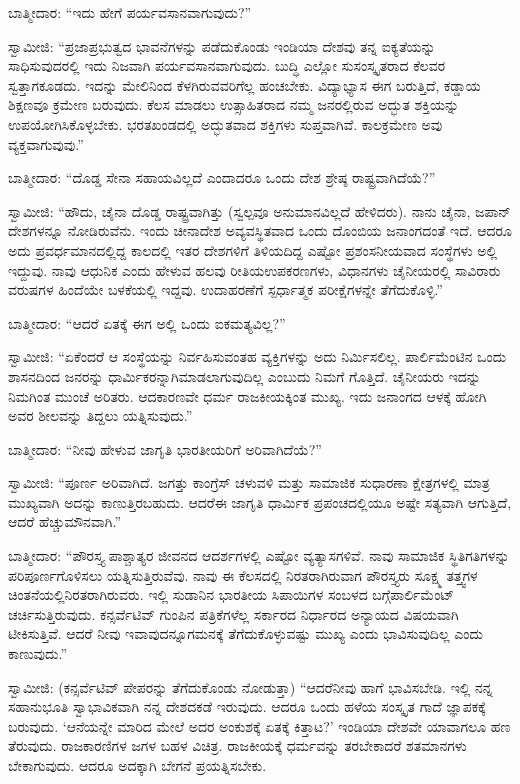 ಬಾತ್ಮೀದಾರ: “ಇದು ಹೇಗೆ ಪರ್ಯವಸಾನವಾಗುವುದು?”

ಸ್ವಾಮೀಜಿ: “ಪ್ರಜಾಪ್ರಭುತ್ವದ ಭಾವನೆಗಳನ್ನು ಪಡೆದುಕೊಂಡು ಇಂಡಿಯಾ ದೇಶವು ತನ್ನ ಐಕ್ಯತೆಯನ್ನು ಸಾಧಿಸುವುದರಲ್ಲಿ ಇದು ನಿಜವಾಗಿ ಪರ್ಯವಸಾನವಾಗುವುದು. ಬುದ್ಧಿ ಎಲ್ಲೋ ಸುಸಂಸ್ಕೃತರಾದ ಕೆಲವರ ಸ್ವತ್ತಾಗಕೂಡದು. ಇದನ್ನು ಮೇಲಿನಿಂದ ಕೆಳಗಿರುವವರಿ\-ಗೆಲ್ಲ ಹಂಚಬೇಕು. ವಿದ್ಯಾಭ್ಯಾಸ ಈಗ ಬರುತ್ತಿದೆ, ಕಡ್ಡಾಯ ಶಿಕ್ಷಣವೂ ಕ್ರಮೇಣ ಬರುವುದು. ಕೆಲಸ ಮಾಡಲು ಉತ್ಸಾಹಿತರಾದ ನಮ್ಮ ಜನರಲ್ಲಿರುವ ಅದ್ಭುತ ಶಕ್ತಿಯನ್ನು ಉಪಯೋಗಿಸಿಕೊಳ್ಳಬೇಕು. ಭರತಖಂಡದಲ್ಲಿ ಅದ್ಭುತವಾದ ಶಕ್ತಿಗಳು ಸುಪ್ತವಾಗಿವೆ. ಕಾಲಕ್ರಮೇಣ ಅವು ವ್ಯಕ್ತವಾಗುವುವು.”

ಬಾತ್ಮೀದಾರ: “ದೊಡ್ಡ ಸೇನಾ ಸಹಾಯವಿಲ್ಲದೆ ಎಂದಾದರೂ ಒಂದು ದೇಶ ಶ್ರೇಷ್ಠ ರಾಷ್ಟ್ರವಾಗಿದೆಯೆ?”

ಸ್ವಾಮೀಜಿ: “ಹೌದು, ಚೈನಾ ದೊಡ್ಡ ರಾಷ್ಟ್ರವಾಗಿತ್ತು (ಸ್ವಲ್ಪವೂ ಅನುಮಾನವಿಲ್ಲದೆ ಹೇಳಿದರು). ನಾನು ಚೈನಾ, ಜಪಾನ್​ ದೇಶಗಳನ್ನೂ ನೋಡಿರುವೆನು. ಇಂದು ಚೀನಾದೇಶ ಅವ್ಯವಸ್ಥಿತವಾದ ಒಂದು ದೊಂಬಿಯ ಜನಾಂಗದಂತೆ ಇದೆ. ಆದರೂ ಅದು ಪ್ರವರ್ಧಮಾನದಲ್ಲಿದ್ದ ಕಾಲದಲ್ಲಿ ಇತರ ದೇಶಗಳಿಗೆ ತಿಳಿಯದಿದ್ದ ಎಷ್ಟೋ ಪ್ರಶಂಸನೀಯ\-ವಾದ ಸಂಸ್ಥೆಗಳು ಅಲ್ಲಿ ಇದ್ದುವು. ನಾವು ಆಧುನಿಕ ಎಂದು ಹೇಳುವ ಹಲವು ರೀತಿಯ\break ಉಪಕರಣಗಳು, ವಿಧಾನಗಳು ಚೈನೀಯರಲ್ಲಿ ಸಾವಿರಾರು ವರುಷಗಳ ಹಿಂದೆಯೇ ಬಳಕೆಯಲ್ಲಿ ಇದ್ದವು. ಉದಾಹರಣೆಗೆ ಸ್ಪರ್ಧಾತ್ಮಕ ಪರೀಕ್ಷೆಗಳನ್ನೇ ತೆಗೆದುಕೊಳ್ಳಿ.”

ಬಾತ್ಮೀದಾರ: “ಆದರೆ ಏತಕ್ಕೆ ಈಗ ಅಲ್ಲಿ ಒಂದು ಐಕಮತ್ಯವಿಲ್ಲ?”

ಸ್ವಾಮೀಜಿ: “ಏಕೆಂದರೆ ಆ ಸಂಸ್ಥೆಯನ್ನು ನಿರ್ವಹಿಸುವಂತಹ ವ್ಯಕ್ತಿಗಳನ್ನು ಅದು ನಿರ್ಮಿಸಲಿಲ್ಲ. ಪಾರ್ಲಿಮೆಂಟಿನ ಒಂದು ಶಾಸನದಿಂದ ಜನರನ್ನು ಧಾರ್ಮಿಕರನ್ನಾಗಿ\break ಮಾಡಲಾಗುವುದಿಲ್ಲ ಎಂಬುದು ನಿಮಗೆ ಗೊತ್ತಿದೆ. ಚೈನೀಯರು ಇದನ್ನು ನಿಮಗಿಂತ ಮುಂಚೆ ಅರಿತರು. ಆದಕಾರಣವೇ ಧರ್ಮ ರಾಜಕೀಯಕ್ಕಿಂತ ಮುಖ್ಯ. ಇದು ಜನಾಂಗದ ಆಳಕ್ಕೆ ಹೋಗಿ ಅವರ ಶೀಲವನ್ನು ತಿದ್ದಲು ಯತ್ನಿಸುವುದು.”

ಬಾತ್ಮೀದಾರ: “ನೀವು ಹೇಳುವ ಜಾಗೃತಿ ಭಾರತೀಯರಿಗೆ ಅರಿವಾಗಿದೆಯೆ?”

ಸ್ವಾಮೀಜಿ: “ಪೂರ್ಣ ಅರಿವಾಗಿದೆ. ಜಗತ್ತು ಕಾಂಗ್ರೆಸ್​ ಚಳುವಳಿ ಮತ್ತು ಸಾಮಾಜಿಕ ಸುಧಾರಣಾ ಕ್ಷೇತ್ರಗಳಲ್ಲಿ ಮಾತ್ರ ಮುಖ್ಯವಾಗಿ ಅದನ್ನು ಕಾಣುತ್ತಿರಬಹುದು. ಆದರೆ\break ಈ ಜಾಗೃತಿ ಧಾರ್ಮಿಕ ಪ್ರಪಂಚದಲ್ಲಿಯೂ ಅಷ್ಟೇ ಸತ್ಯವಾಗಿ ಆಗುತ್ತಿದೆ, ಆದರೆ ಹೆಚ್ಚು\break ಮೌನವಾಗಿ.”

ಬಾತ್ಮೀದಾರ: “ಪೌರಸ್ತ್ಯ ಪಾಶ್ಚಾತ್ಯರ ಜೀವನದ ಆದರ್ಶಗಳಲ್ಲಿ ಎಷ್ಟೋ ವ್ಯತ್ಯಾಸಗಳಿವೆ. ನಾವು ಸಾಮಾಜಿಕ ಸ್ಥಿತಿಗತಿಗಳನ್ನು ಪರಿಪೂರ್ಣಗೊಳಿಸಲು ಯತ್ನಿಸುತ್ತಿರುವೆವು. ನಾವು ಈ ಕೆಲಸದಲ್ಲಿ ನಿರತರಾಗಿರುವಾಗ ಪೌರಸ್ತ್ಯರು ಸೂಕ್ಷ್ಮ ತತ್ತ್ವಗಳ ಚಿಂತನೆಯಲ್ಲಿ\break ನಿರತರಾಗಿರುವರು. ಇಲ್ಲಿ ಸುಡಾನಿನ ಭಾರತೀಯ ಸಿಪಾಯಿಗಳ ಸಂಬಳದ ಬಗ್ಗೆ\break ಪಾರ್ಲಿಮೆಂಟ್​ ಚರ್ಚಿಸುತ್ತಿರುವುದು. ಕನ್ಸರ್ವೆಟಿವ್​ ಗುಂಪಿನ ಪತ್ರಿಕೆಗಳೆಲ್ಲ ಸರ್ಕಾರದ ನಿರ್ಧಾರದ ಅನ್ಯಾಯದ ವಿಷಯವಾಗಿ ಟೀಕಿಸುತ್ತಿವೆ. ಆದರೆ ನೀವು ಇವಾವುದನ್ನೂ\break ಗಮನಕ್ಕೆ ತೆಗೆದುಕೊಳ್ಳುವಷ್ಟು ಮುಖ್ಯ ಎಂದು ಭಾವಿಸುವುದಿಲ್ಲ ಎಂದು ಕಾಣುವುದು.”

ಸ್ವಾಮೀಜಿ: (ಕನ್ಸರ್ವೆಟಿವ್​ ಪೇಪರನ್ನು ತೆಗೆದುಕೊಂಡು ನೋಡುತ್ತಾ) “ಆದರೆ\break ನೀವು ಹಾಗೆ ಭಾವಿಸಬೇಡಿ. ಇಲ್ಲಿ ನನ್ನ ಸಹಾನುಭೂತಿ ಸ್ವಾಭಾವಿಕವಾಗಿ ನನ್ನ ದೇಶದ\break ಕಡೆ ಇರುವುದು. ಆದರೂ ಒಂದು ಹಳೆಯ ಸಂಸ್ಕೃತ ಗಾದೆ ಜ್ಞಾಪಕಕ್ಕೆ ಬರುವುದು. ‘ಆನೆಯನ್ನೇ ಮಾರಿದ ಮೇಲೆ ಅದರ ಅಂಕುಶಕ್ಕೆ ಏತಕ್ಕೆ ಕಿತ್ತಾಟ?’ ಇಂಡಿಯಾ ದೇಶವೇ ಯಾವಾಗಲೂ ಹಣ ತೆರುವುದು. ರಾಜಕಾರಣಿಗಳ ಜಗಳ ಬಹಳ ವಿಚಿತ್ರ. ರಾಜಕೀಯಕ್ಕೆ ಧರ್ಮವನ್ನು ತರಬೇಕಾದರೆ ಶತಮಾನಗಳು ಬೇಕಾಗುವುದು. ಆದರೂ ಅದಕ್ಕಾಗಿ ಬೇಗನೆ ಪ್ರಯತ್ನಿಸಬೇಕು.

